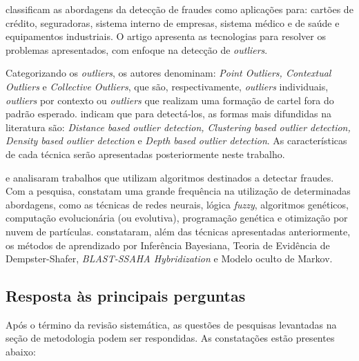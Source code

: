 \documentclass[smallextended]{svjour3}
\begin{document}
\cite{Bansal2016} classificam as abordagens da detecção de fraudes como aplicações para: cartões de crédito, seguradoras, sistema interno de empresas, sistema médico e de saúde e equipamentos industriais. O artigo apresenta as tecnologias para resolver os problemas apresentados, com enfoque na detecção de \emph{outliers}. 

Categorizando os \emph{outliers}, os autores denominam: \emph{Point Outliers, Contextual Outliers} e \emph{Collective Outliers}, que são, respectivamente, \emph{outliers} individuais, \emph{outliers} por contexto ou \emph{outliers} que realizam uma formação de cartel fora do padrão esperado. \cite{Bansal2016} indicam que para detectá-los, as formas mais difundidas na literatura são: \emph{Distance based outlier detection, Clustering based outlier detection, Density based outlier detection} e \emph{Depth based outlier detection}. As características de cada técnica serão apresentadas posteriormente neste trabalho.

\cite{Pejic-Bach2010} e \cite{Raj2011} analisaram trabalhos que utilizam algoritmos destinados a detectar fraudes. Com a pesquisa, constatam uma grande frequência na utilização de determinadas abordagens, como as técnicas de redes neurais, lógica \emph{fuzzy}, algoritmos genéticos, computação evolucionária (ou evolutiva), programação genética e otimização por nuvem de partículas. \cite{Raj2011} constataram, além das técnicas apresentadas anteriormente, os métodos de aprendizado por Inferência Bayesiana, Teoria de Evidência de Dempster-Shafer, \emph{BLAST-SSAHA Hybridization} e Modelo oculto de Markov.

\subsection{Resposta às principais perguntas}

Após o término da revisão sistemática, as questões de pesquisas levantadas na seção de metodologia podem ser respondidas. As constatações estão presentes abaixo:
\end{document}
